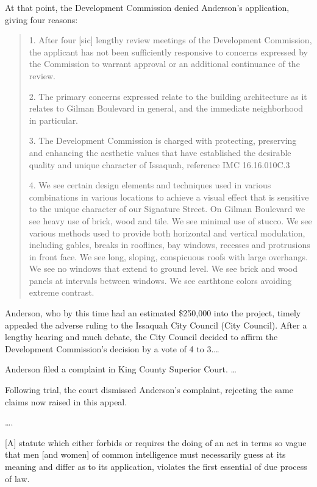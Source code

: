 At that point, the Development Commission denied Anderson's application, giving
four reasons:
\begin{quotation}
1. After four [sic] lengthy review meetings of the Development
Commission, the applicant has not been sufficiently responsive to concerns
expressed by the Commission to warrant approval or an additional continuance of
the review.

2. The primary concerns expressed relate to the building architecture as
it relates to Gilman Boulevard in general, and the immediate neighborhood in
particular. 

3. The Development Commission is charged with protecting, preserving and
enhancing the aesthetic values that have established the desirable quality and
unique character of Issaquah, reference IMC 16.16.010C.3

4. We see certain design elements and techniques used in various
combinations in various locations to achieve a visual effect that is
sensitive to the unique character of our Signature Street. On Gilman Boulevard
we see heavy use of brick, wood and tile. We see minimal use of stucco. We see
various methods used to provide both horizontal and vertical modulation,
including gables, breaks in rooflines, bay windows, recesses and protrusions in
front face. We see long, sloping, conspicuous roofs with large overhangs. We see
no windows that extend to ground level. We see brick and wood panels at
intervals between windows. We see earthtone colors avoiding extreme contrast.
\end{quotation}

Anderson, who by this time had an estimated \$250,000 into the project, timely
appealed the adverse ruling to the Issaquah City Council (City Council). After a
lengthy hearing and much debate, the City Council decided to affirm the
Development Commission's decision by a vote of 4 to 3.\ldots

Anderson filed a complaint in King County Superior Court. \ldots

Following trial, the court dismissed Anderson's complaint, rejecting the same
claims now raised in this appeal.



\ldots.


[A] statute which either forbids or requires the doing of an act in terms so
vague that men [and women] of common intelligence must necessarily guess at its
meaning and differ as to its application, violates the first essential of
due process of law.

